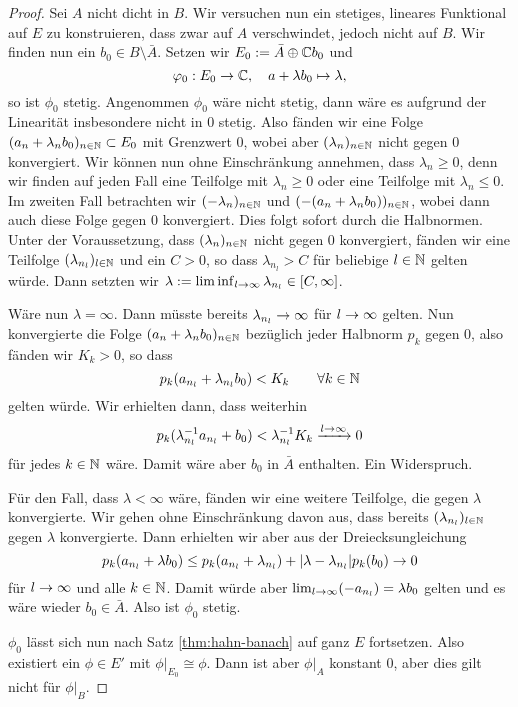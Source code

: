 \begin{proof}
  Sei $A$ nicht dicht in $B$. Wir versuchen nun ein stetiges, lineares
  Funktional auf $E$ zu konstruieren, dass zwar auf $A$ verschwindet,
  jedoch nicht auf $B$. Wir finden nun ein $b_0 \in B \setminus
  \bar A$. Setzen wir $E_0 := \bar A \oplus \mathbb{C} b_0$ und
  \[
  \varphi_0: E_0 \rightarrow \mathbb{C}, \quad a + \lambda b_0 \mapsto \lambda,
  \]
  so ist $\phi_0$ stetig. Angenommen $\phi_0$ wäre nicht stetig, dann
  wäre es aufgrund der Linearität insbesondere nicht in $0$
  stetig. Also fänden wir eine Folge $(a_n + \lambda_n b_0)_{n \in
    \mathbb{N}} \subset E_0$ mit Grenzwert $0$, wobei aber $(\lambda_n)_{n \in
    \mathbb{N}}$ nicht gegen 0 konvergiert. Wir können nun ohne Einschränkung
  annehmen, dass $\lambda_n \geq 0$, denn wir finden auf jeden Fall
  eine Teilfolge mit $\lambda_n \geq 0$ oder eine Teilfolge mit
  $\lambda_n \leq 0$. Im zweiten Fall betrachten wir $(-\lambda_n)_{n
    \in \mathbb{N}}$ und $(-(a_n + \lambda_n b_0))_{n \in \mathbb{N}}$, wobei dann auch
  diese Folge gegen $0$ konvergiert. Dies folgt sofort durch die
  Halbnormen. Unter der Voraussetzung, dass $(\lambda_n)_{n\in\mathbb{N}}$ nicht gegen $0$
  konvergiert, fänden wir eine Teilfolge $(\lambda_{n_l})_{l\in \mathbb{N}}$
  und ein $C > 0$, so dass $\lambda_{n_l} > C$ für beliebige $l \in
  \mathbb{N}$ gelten würde. Dann setzten wir $\lambda := \liminf_{l \rightarrow \infty}
  \lambda_{n_l} \in [C, \infty]$.

  Wäre nun $\lambda = \infty$. Dann müsste bereits
  $\lambda_{n_l} \rightarrow \infty$ für $l \rightarrow \infty$ gelten. Nun
  konvergierte die Folge $(a_n + \lambda_n b_0)_{n \in \mathbb{N}}$ bezüglich
  jeder Halbnorm $p_k$ gegen 0, also fänden wir $K_k > 0$, so dass
  \[
  p_k(a_{n_l} + \lambda_{n_l}b_0) < K_k \qquad \forall k \in \mathbb{N}
  \]
  gelten würde. Wir erhielten dann, dass weiterhin
  \[
  p_k(\lambda_{n_l}^{-1}a_{n_l} + b_0) < \lambda_{n_l}^{-1} K_k
  \xrightarrow{l \rightarrow \infty} 0
  \]
  für jedes $k \in \mathbb{N}$ wäre. Damit wäre aber $b_0$ in $\bar A$ enthalten. Ein
  Widerspruch.

  Für den Fall, dass $\lambda < \infty$ wäre, fänden wir eine weitere
  Teilfolge, die gegen $\lambda$ konvergierte. Wir gehen ohne
  Einschränkung davon aus, dass bereits $(\lambda_{n_l})_{l \in \mathbb{N}}$
  gegen $\lambda$ konvergierte. Dann erhielten wir aber aus der
  Dreiecksungleichung
  \[
  p_k(a_{n_l} + \lambda b_0) \leq p_k(a_{n_l} + \lambda_{n_l}) +
  |\lambda - \lambda_{n_l}| p_k(b_0) \rightarrow 0
  \]
  für $l \rightarrow \infty$ und alle $k \in \mathbb{N}$. Damit würde aber $\lim_{l
    \rightarrow \infty}(-a_{n_l}) = \lambda b_0$ gelten und es wäre wieder
  $b_0 \in \bar A$. Also ist $\phi_0$ stetig.
  
  $\phi_0$ lässt sich nun nach Satz \ref{thm:hahn-banach}
  auf ganz $E$ fortsetzen. Also existiert ein $\phi \in E'$ mit
  $\phi|_{E_0} \cong \phi$. Dann ist aber $\phi|_A$ konstant 0, aber
  dies gilt nicht für $\phi|_B$.
\end{proof}

